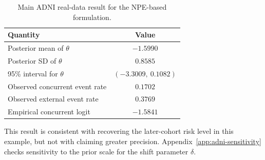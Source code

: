 \begin{table}[H]
\centering
\caption{Main ADNI real-data result for the NPE-based formulation.}
\label{tab:adni-main-results}
\begin{tabular}{lc}
\toprule
Quantity & Value \\
\midrule
Posterior mean of $\theta$     & $-1.5990$ \\
Posterior SD of $\theta$       & $0.8585$ \\
95\% interval for $\theta$     & $(-3.3009,\ 0.1082)$ \\
Observed concurrent event rate & $0.1702$ \\
Observed external event rate   & $0.3769$ \\
Empirical concurrent logit     & $-1.5841$ \\
\bottomrule
\end{tabular}
\end{table}

This result is consistent with recovering the later-cohort risk level in this
example, but not with claiming greater precision. Appendix~\ref{app:adni-sensitivity}
checks sensitivity to the prior scale for the shift parameter $\delta$.

\FloatBarrier

\FloatBarrier
